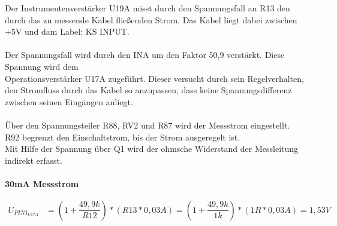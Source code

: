 Der Instrumentenverstärker U19A misst durch den Spannungsfall an R13 den durch das zu messende Kabel fließenden Strom. Das Kabel liegt dabei zwischen +5V und dam Label: KS INPUT.
\\
\\
Der Spannungsfall wird durch den INA um den Faktor 50,9 verstärkt. Diese Spannung wird dem\\ Operationsverstärker U17A zugeführt. Dieser versucht durch sein Regelverhalten, den Stromfluss durch das Kabel so anzupassen, dass keine Spannungsdifferenz zwischen seinen Eingängen anliegt.
\\
\\
Über den Spannungsteiler R88, RV2 und R87 wird der Messstrom eingestellt. 
\\
R92 begrenzt den Einschaltstrom, bis der Strom ausgeregelt ist. 
\\
Mit Hilfe der Spannung über Q1 wird der ohmsche Widerstand der Messleitung indirekt erfasst.
\\
\\
\textbf{30mA Messstrom}
\\
\begin{center}
\begin{align*}
	U_{PIN1_{U17A}} &= (1 + \dfrac{49,9k}{R12}) * (R13 * 0,03A) = (1 + \dfrac{49,9k}{1k}) * (1R * 0,03A) = 1,53V
\end{align*} 
\end{center}


\newpage
